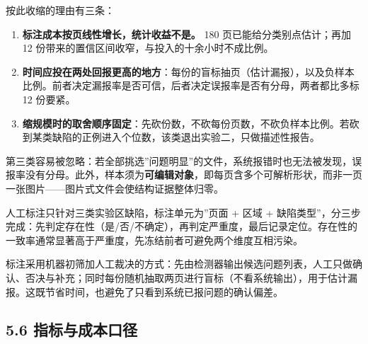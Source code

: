\documentclass[
  11pt,
]{article}
\providecommand{\tightlist}{%
  \setlength{\itemsep}{0pt}\setlength{\parskip}{0pt}}
\begin{document}
按此收缩的理由有三条：

\begin{enumerate}
\def\labelenumi{\arabic{enumi}.}
\tightlist
\item
  \textbf{标注成本按页线性增长，统计收益不是。} 180
  页已能给分类别点估计；再加 12
  份带来的置信区间收窄，与投入的十余小时不成比例。
\item
  \textbf{时间应投在两处回报更高的地方}：每份的盲标抽页（估计漏报），以及负样本比例。前者决定漏报率是否可信，后者决定误报率是否有分母，两者都比多标
  12 份要紧。
\item
  \textbf{缩规模时的取舍顺序固定}：先砍份数，不砍每份页数，不砍负样本比例。若砍到某类缺陷的正例进入个位数，该类退出实验二，只做描述性报告。
\end{enumerate}

第三类容易被忽略：若全部挑选''问题明显''的文件，系统报错时也无法被发现，误报率没有分母。此外，样本须为\textbf{可编辑对象}，即每页含多个可解析形状，而非一页一张图片------图片式文件会使结构证据整体归零。

人工标注只针对三类实验区缺陷，标注单元为''页面 + 区域 +
缺陷类型''，分三步完成：先判定存在性（是/否/不确定），再判定严重度，最后记录定位。存在性的一致率通常显著高于严重度，先冻结前者可避免两个维度互相污染。

标注采用机器初筛加人工裁决的方式：先由检测器输出候选问题列表，人工只做确认、否决与补充；同时每份随机抽取两页进行盲标（不看系统输出），用于估计漏报。这既节省时间，也避免了只看到系统已报问题的确认偏差。

\subsection{5.6
指标与成本口径}\label{ux6307ux6807ux4e0eux6210ux672cux53e3ux5f84}
\end{document}
